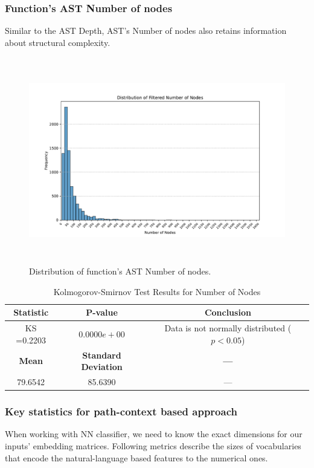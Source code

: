 \documentclass[10pt,english,a4paper]{report}
\begin{document}
\subsubsection{Function's AST Number of nodes}

Similar to the AST Depth, AST's Number of nodes also retains information
about structural complexity.

\begin{figure}[H]
    \centering
    \includegraphics[width=16cm, height=9cm]{figures/num_nodes_merged.pdf}
    \caption{Distribution of function's AST Number of nodes.}
    \label{fig:ast_num_nodes_merged}
\end{figure}

\begin{table}[h!]
    \centering
    \caption{Kolmogorov-Smirnov Test Results for Number of Nodes}
    \label{tab:kolmogorov_smirnov_nodes}
    \begin{tabular}{|c|c|c|}
        \hline
        \textbf{Statistic} & \textbf{P-value} & \textbf{Conclusion} \\
        \hline
        KS =0.2203 & $0.0000e+00$ & Data is not normally distributed ($p < 0.05$) \\
        \hline
        \textbf{Mean} & \textbf{Standard Deviation} & \textbf{---} \\
        \hline
        79.6542 & 85.6390 & --- \\
        \hline
    \end{tabular}
\end{table}

\subsubsection{Key statistics for path-context based approach}
When working with NN classifier, we need to know the exact dimensions for our
inputs' embedding matrices. Following metrics describe the sizes of vocabularies
that encode the natural-language based features to the numerical ones.
\end{document}
